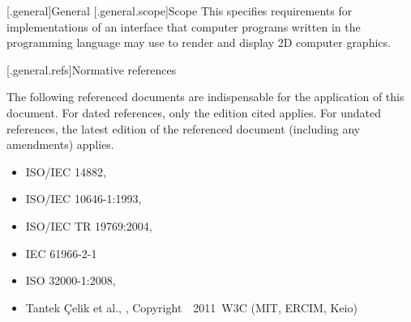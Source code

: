 [\iotwod.general]{General}
[\iotwod.general.scope]{Scope}
\pnum
{}%
This \documenttypename{} specifies requirements for implementations
of an interface that computer programs written in the \Cpp programming
language may use to render and display 2D computer graphics.

[\iotwod.general.refs]{Normative references}

\pnum
{}%
The following referenced documents are indispensable for the application
of this document. For dated references, only the edition cited applies.
For undated references, the latest edition of the referenced document
(including any amendments) applies.

\begin{itemize}
\item ISO/IEC 14882, 
\item ISO/IEC 10646-1:1993, 
\item ISO/IEC TR 19769:2004, 
\item IEC 61966-2-1 
\item ISO 32000-1:2008, 
\item Tantek \c{C}elik et al., , 
Copyright~\textcopyright~2011~W3C\textsuperscript{\textregistered} (MIT, ERCIM, 
Keio)
\end{itemize}

